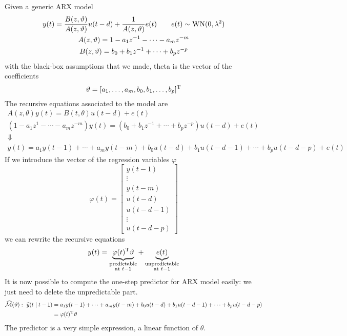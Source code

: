 Given a generic ARX model
\begin{gather*}
y(t) =\frac{B(z,\vartheta)}{A(z,\vartheta)} u(t-d) +\frac{1}{A(z,\vartheta)} e(t) \qquad e(t) \sim \operatorname{WN}(0,\lambda ^{2})\\
A(z,\vartheta) =1-a_{1} z^{-1} -\cdots -a_{m} z^{-m}\\
B(z,\vartheta) =b_{0} +b_{1} z^{-1} +\cdots +b_{p} z^{-p}
\end{gather*}
with the black-box assumptions that we made, theta is the vector of the coefficients
\begin{equation*}
\vartheta = [ a_{1},\ldots,a_{m},b_{0},b_{1},\ldots,b_{p}]^{\mathrm{T}}
\end{equation*}
The recursive equations associated to the model are
\begin{gather*}
A(z,\theta) y(t) =B(t,\theta) u(t-d) +e(t)\\
\left(1-a_{1} z^{1} -\cdots -a_{m} z^{-m}\right) y(t) =\left(b_{0} +b_{1} z^{-1} +\cdots +b_{p} z^{-p}\right) u(t-d) +e(t)\\
\Downarrow \\
y(t) =a_{1} y(t-1) +\cdots +a_{m} y(t-m) +b_{0} u(t-d) +b_{1} u(t-d-1) +\cdots +b_{p} u(t-d-p) +e(t)
\end{gather*}
If we introduce the vector of the regression variables $ \varphi $
\begin{equation*}
\varphi (t) =\begin{bmatrix}
y(t-1)\\
\vdots\\
y(t-m)\\
u(t-d)\\
u(t-d-1)\\
\vdots\\
u(t-d-p)
\end{bmatrix}
\end{equation*}
we can rewrite the recursive equations
\begin{equation*}
	y(t) =\underbrace{\varphi (t)^{\mathrm{T}} \vartheta }_{\substack{\text{predictable}\\\text{at }t-1}} +\underbrace{e(t)}_{\substack{\text{unpredictable}\\\text{at }t-1}}
\end{equation*}
It is now possible to compute the one-step predictor for ARX model easily: we just need to delete the unpredictable part.
\begin{align*}
	\widehat{\mathcal{M}}(\vartheta) :\ \widehat{y}(t\mid t-1) & =a_{1} y(t-1) +\cdots +a_{m} y(t-m) +b_{0} u(t-d) +b_{1} u(t-d-1) +\cdots +b_{p} u(t-d-p)\\
	& =\varphi (t)^{\mathrm{T}} \vartheta 
\end{align*}
The predictor is a very simple expression, a linear function of $ \theta $.

